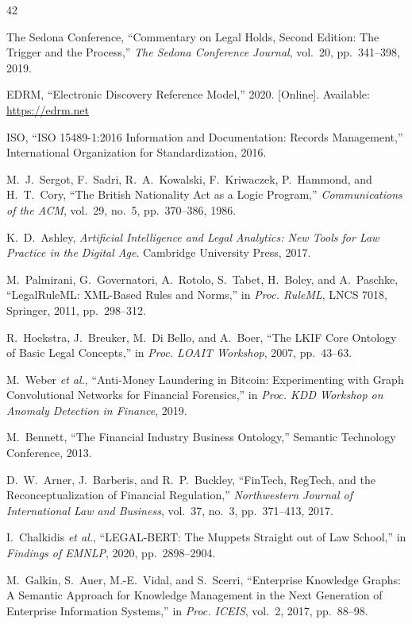 \documentclass{ieeeaccess}
\begin{document}
\begin{thebibliography}{42}

The Sedona Conference, ``Commentary on Legal Holds, Second Edition: The Trigger and the Process,'' \textit{The Sedona Conference Journal}, vol.~20, pp.~341--398, 2019.

EDRM, ``Electronic Discovery Reference Model,'' 2020. [Online]. Available: \url{https://edrm.net}

ISO, ``ISO 15489-1:2016 Information and Documentation: Records Management,'' International Organization for Standardization, 2016.

M.~J.~Sergot, F.~Sadri, R.~A.~Kowalski, F.~Kriwaczek, P.~Hammond, and H.~T.~Cory, ``The British Nationality Act as a Logic Program,'' \textit{Communications of the ACM}, vol.~29, no.~5, pp.~370--386, 1986.

K.~D.~Ashley, \textit{Artificial Intelligence and Legal Analytics: New Tools for Law Practice in the Digital Age}. Cambridge University Press, 2017.

M.~Palmirani, G.~Governatori, A.~Rotolo, S.~Tabet, H.~Boley, and A.~Paschke, ``LegalRuleML: XML-Based Rules and Norms,'' in \textit{Proc. RuleML}, LNCS 7018, Springer, 2011, pp.~298--312.

R.~Hoekstra, J.~Breuker, M.~Di Bello, and A.~Boer, ``The LKIF Core Ontology of Basic Legal Concepts,'' in \textit{Proc. LOAIT Workshop}, 2007, pp.~43--63.

M.~Weber \textit{et al.}, ``Anti-Money Laundering in Bitcoin: Experimenting with Graph Convolutional Networks for Financial Forensics,'' in \textit{Proc. KDD Workshop on Anomaly Detection in Finance}, 2019.

M.~Bennett, ``The Financial Industry Business Ontology,'' Semantic Technology Conference, 2013.

D.~W.~Arner, J.~Barberis, and R.~P.~Buckley, ``FinTech, RegTech, and the Reconceptualization of Financial Regulation,'' \textit{Northwestern Journal of International Law and Business}, vol.~37, no.~3, pp.~371--413, 2017.

I.~Chalkidis \textit{et al.}, ``LEGAL-BERT: The Muppets Straight out of Law School,'' in \textit{Findings of EMNLP}, 2020, pp.~2898--2904.

M.~Galkin, S.~Auer, M.-E.~Vidal, and S.~Scerri, ``Enterprise Knowledge Graphs: A Semantic Approach for Knowledge Management in the Next Generation of Enterprise Information Systems,'' in \textit{Proc. ICEIS}, vol.~2, 2017, pp.~88--98.


\end{thebibliography}
\end{document}
